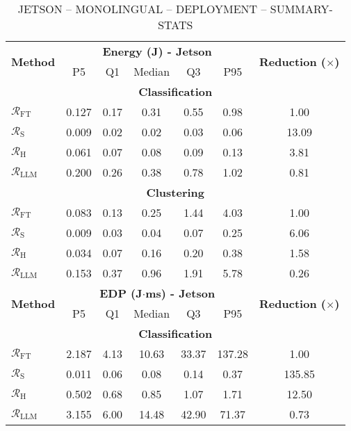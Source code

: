 \begin{table}[t]
\centering
\scriptsize
\caption{JETSON -- MONOLINGUAL -- DEPLOYMENT -- SUMMARY-STATS}
\label{tab:jetson_rq1}
\begin{tabular}{lcccccc}
\toprule
\multirow{2}{*}{\textbf{Method}} 
& \multicolumn{5}{c}{\textbf{Energy (J) - Jetson}} & \multirow{2}{*}{\textbf{Reduction ($\times$)}} \\
\cmidrule(lr){2-6}
 & P5 & Q1 & Median & Q3 & P95 &  \\
\midrule
\multicolumn{7}{c}{\textbf{Classification}} \\  %
$\mathcal{R}_\text{FT}$ & 0.127 & 0.17 & 0.31 & 0.55 & 0.98 & 1.00 \\ %
$\mathcal{R}_\text{S}$ & 0.009 & 0.02 & 0.02 & 0.03 & 0.06 & 13.09 \\ %
$\mathcal{R}_\text{H}$ & 0.061 & 0.07 & 0.08 & 0.09 & 0.13 & 3.81 \\ %
$\mathcal{R}_\text{LLM}$ & 0.200 & 0.26 & 0.38 & 0.78 & 1.02 & 0.81 \\ %
\multicolumn{7}{c}{\textbf{Clustering}} \\  %
$\mathcal{R}_\text{FT}$ & 0.083 & 0.13 & 0.25 & 1.44 & 4.03 & 1.00 \\ %
$\mathcal{R}_\text{S}$ & 0.009 & 0.03 & 0.04 & 0.07 & 0.25 & 6.06 \\ %
$\mathcal{R}_\text{H}$ & 0.034 & 0.07 & 0.16 & 0.20 & 0.38 & 1.58 \\ %
$\mathcal{R}_\text{LLM}$ & 0.153 & 0.37 & 0.96 & 1.91 & 5.78 & 0.26 \\ %
\midrule
\multirow{2}{*}{\textbf{Method}} 
& \multicolumn{5}{c}{\textbf{EDP (J$\cdot$ms) - Jetson}} & \multirow{2}{*}{\textbf{Reduction ($\times$)}} \\
\cmidrule(lr){2-6}
 & P5 & Q1 & Median & Q3 & P95 & \\
\midrule
\multicolumn{7}{c}{\textbf{Classification}} \\  %
$\mathcal{R}_\text{FT}$ & 2.187 & 4.13 & 10.63 & 33.37 & 137.28 & 1.00 \\ %
$\mathcal{R}_\text{S}$ & 0.011 & 0.06 & 0.08 & 0.14 & 0.37 & 135.85 \\ %
$\mathcal{R}_\text{H}$ & 0.502 & 0.68 & 0.85 & 1.07 & 1.71 & 12.50 \\ %
$\mathcal{R}_\text{LLM}$ & 3.155 & 6.00 & 14.48 & 42.90 & 71.37 & 0.73 \\ %

\end{tabular}
\end{table}
